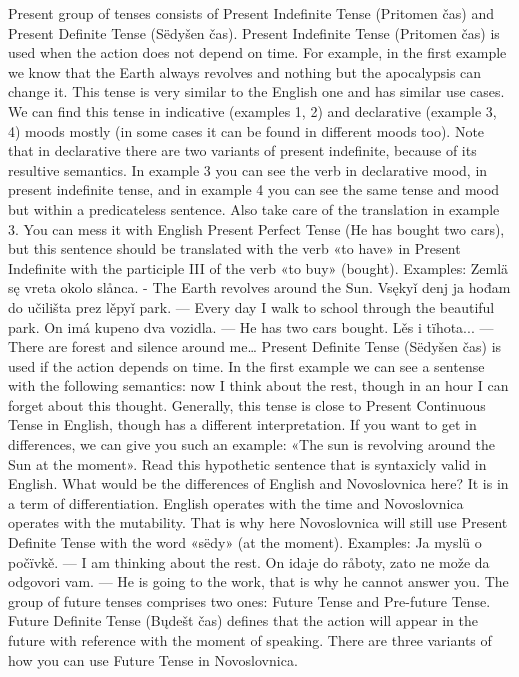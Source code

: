 Present group of tenses consists of Present Indefinite Tense (Pritomen čas) and Present Definite Tense (Sëdyšen čas).
Present Indefinite Tense (Pritomen čas) is used when the action does not depend on time. For example, in the first example we know that the Earth always revolves and nothing but the apocalypsis can change it. This tense is very similar to the English one and has similar use cases. We can find this tense in indicative (examples 1, 2) and declarative (example 3, 4) moods mostly (in some cases it can be found in different moods too).
Note that in declarative there are two variants of present indefinite, because of its resultive semantics. In example 3 you can see the verb in declarative mood, in present indefinite tense, and in example 4 you can see the same tense and mood but within a predicateless sentence.
Also take care of the translation in example 3. You can mess it with English Present Perfect Tense (He has bought two cars), but this sentence should be translated with the verb «to have» in Present Indefinite with the participle III of the verb «to buy» (bought).
Examples:
Zemlä sę vreta okolo slånca. - The Earth revolves around the Sun.
Vsękyǐ denj ja hođam do učilišta prez lěpyǐ park. — Every day I walk to school through the beautiful park.
On imá kupeno dva vozidla. — He has two cars bought.
Lěs i tïhota... — There are forest and silence around me…
Present Definite Tense (Sëdyšen čas) is used if the action depends on time. In the first example we can see a sentense with the following semantics: now I think about the rest, though in an hour I can forget about this thought.
Generally, this tense is close to Present Continuous Tense in English, though has a different interpretation. If you want to get in differences, we can give you such an example: «The sun is revolving around the Sun at the moment». Read this hypothetic sentence that is syntaxicly valid in English.
What would be the differences of English and Novoslovnica here? It is in a term of differentiation. English operates with the time and Novoslovnica operates with the mutability. That is why here Novoslovnica will still use Present Definite Tense with the word «sëdy» (at the moment).
Examples:
Ja myslü o počïvkě. — I am thinking about the rest.
On idaje do råboty, zato ne može da odgovori vam. — He is going to the work, that is why he cannot answer you.
The group of future tenses comprises two ones: Future Tense and Pre-future Tense.
Future Definite Tense (Bųdešt čas) defines that the action will appear in the future with reference with the moment of speaking. There are three variants of how you can use Future Tense in Novoslovnica.
